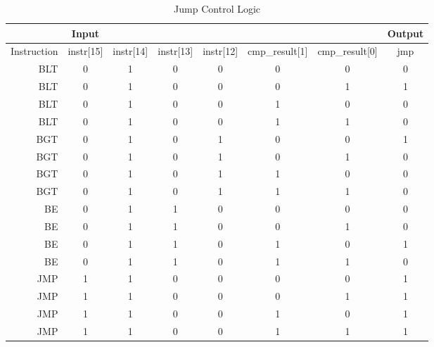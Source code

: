     
    \begin{table}[htbp]
        \caption{Jump Control Logic}
        \label{jmp}
        \centering
        \begin{tabular}{r | c c c c c c | c }
                    & Input     &           &           &           &                &                & Output\\
                    \hline
        Instruction & instr[15] & instr[14] & instr[13] & instr[12] & cmp\_result[1] & cmp\_result[0] & jmp\\
        BLT         & 0         & 1         & 0         & 0         & 0              & 0              & 0\\
        BLT         & 0         & 1         & 0         & 0         & 0              & 1              & 1\\
        BLT         & 0         & 1         & 0         & 0         & 1              & 0              & 0\\
        BLT         & 0         & 1         & 0         & 0         & 1              & 1              & 0\\
        BGT         & 0         & 1         & 0         & 1         & 0              & 0              & 1\\
        BGT         & 0         & 1         & 0         & 1         & 0              & 1              & 0\\
        BGT         & 0         & 1         & 0         & 1         & 1              & 0              & 0\\
        BGT         & 0         & 1         & 0         & 1         & 1              & 1              & 0\\
        BE          & 0         & 1         & 1         & 0         & 0              & 0              & 0\\
        BE          & 0         & 1         & 1         & 0         & 0              & 1              & 0\\
        BE          & 0         & 1         & 1         & 0         & 1              & 0              & 1\\
        BE          & 0         & 1         & 1         & 0         & 1              & 1              & 0\\
        JMP         & 1         & 1         & 0         & 0         & 0              & 0              & 1\\
        JMP         & 1         & 1         & 0         & 0         & 0              & 1              & 1\\
        JMP         & 1         & 1         & 0         & 0         & 1              & 0              & 1\\
        JMP         & 1         & 1         & 0         & 0         & 1              & 1              & 1\\
        \end{tabular}
    \end{table}
	
